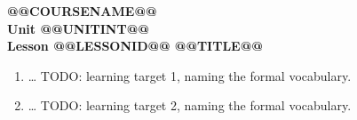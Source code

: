 \documentclass[10pt]{article}
\begin{document}
\vspace{-0.8in}

\begin{center}
  {\color{white}\textbf{\LARGE @@COURSENAME@@}}\\[4pt]
  {\color{frostmid}\large\textbf{Unit @@UNITINT@@}}\\[6pt]
  {\color{white}\textbf{\large Lesson @@LESSONID@@ \quad @@TITLE@@}}
\end{center}

\vspace{0.22in}
\namedateperiod
\vspace{0.18in}

\begin{learningtargetbox}
\small
\begin{enumerate}[leftmargin=1.5em, itemsep=5pt]
  \item \ldots{} TODO: learning target 1, naming the formal vocabulary.
  \item \ldots{} TODO: learning target 2, naming the formal vocabulary.
\end{enumerate}
\end{learningtargetbox}

\vspace{0.14in}
\end{document}

